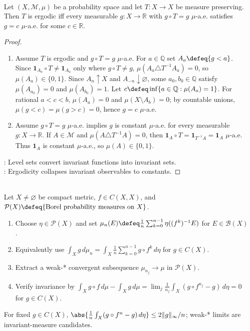 \begin{proposition} \label{prop:ergodicity-invariant-functions-constant} \\
Let $(X,\mathcal{M},\mu)$ be a probability space and let $T:X\to X$ be measure preserving. Then $T$ is ergodic iff every measurable $g:X\to\mathbb{R}$ with $g\circ T=g$ $\mu$-a.e. satisfies $g=c$ $\mu$-a.e. for some $c\in\mathbb{R}$.
\begin{proof}
\begin{enumerate}[label=\roman*.]
\setlength{\itemsep}{0pt}
\item[$(\Rightarrow)$] Assume $T$ is ergodic and $g\circ T=g$ $\mu$-a.e. For $a\in\mathbb{Q}$ set $A_a\defeq\{g<a\}$. Since $\mathbf{1}_{A_a}\circ T\ne\mathbf{1}_{A_a}$ only where $g\circ T\ne g$, $\mu(A_a\triangle T^{-1}A_a)=0$, so $\mu(A_a)\in\{0,1\}$. Since $A_n\uparrow X$ and $A_{-n}\downarrow\varnothing$, some $a_0,b_0\in\mathbb{Q}$ satisfy $\mu(A_{a_0})=0$ and $\mu(A_{b_0})=1$. Let $c\defeq\inf\{a\in\mathbb{Q}:\mu(A_a)=1\}$. For rational $a<c<b$, $\mu(A_a)=0$ and $\mu(X\setminus A_b)=0$; by countable unions, $\mu(g<c)=\mu(g>c)=0$, hence $g=c$ $\mu$-a.e.
\item[$(\Leftarrow)$] Assume $g\circ T=g$ $\mu$-a.e. implies $g$ is constant $\mu$-a.e. for every measurable $g:X\to\mathbb{R}$. If $A\in\mathcal{M}$ and $\mu(A\triangle T^{-1}A)=0$, then $\mathbf{1}_A\circ T=\mathbf{1}_{T^{-1}A}=\mathbf{1}_A$ $\mu$-a.e. Thus $\mathbf{1}_A$ is constant $\mu$-a.e., so $\mu(A)\in\{0,1\}$.
\end{enumerate}
: Level sets convert invariant functions into invariant sets.\\
: Ergodicity collapses invariant observables to constants.
\end{proof}
\end{proposition}

\begin{method} \label{meth:krylov-bogoliubov-averaging} \\
Let $X\ne\varnothing$ be compact metric, $f\in C(X,X)$, and $\mathcal{P}(X)\defeq\{\text{Borel probability measures on }X\}$.
\begin{enumerate}[label=(\roman*)]
\setlength{\itemsep}{0pt}
\item Choose $\eta\in\mathcal{P}(X)$ and set $\mu_n(E)\defeq\frac1n\sum_{k=0}^{n-1}\eta((f^k)^{-1}E)$ for $E\in\mathcal{B}(X)$.
\item Equivalently use $\int_X g\,d\mu_n=\int_X\frac1n\sum_{k=0}^{n-1}g\circ f^k\,d\eta$ for $g\in C(X)$.
\item Extract a weak-* convergent subsequence $\mu_{n_j}\to\mu$ in $\mathcal{P}(X)$.
\item Verify invariance by $\int_X g\circ f\,d\mu-\int_X g\,d\mu=\lim_j\frac1{n_j}\int_X(g\circ f^{n_j}-g)\,d\eta=0$ for $g\in C(X)$.
\end{enumerate}
For fixed $g\in C(X)$, $\abs{\frac1n\int_X(g\circ f^n-g)\,d\eta}\le2\|g\|_\infty/n$; weak-* limits are invariant-measure candidates.
\end{method}

